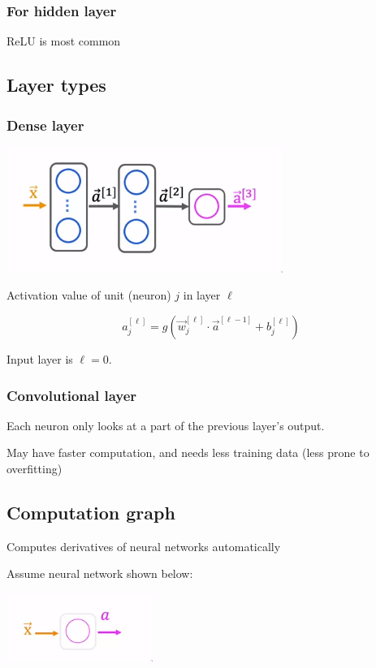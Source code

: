 \documentclass[12pt]{article}
\begin{document}
\subsubsection*{For hidden layer}

ReLU is most common

\subsection{Layer types}

\subsubsection*{Dense layer}

\includegraphics{nn/dense_layer}

Activation value of unit (neuron) $j$ in layer $\ell$

\[ a_j^{[\ell]} = g(\vec{w}_j^{[\ell]} \cdot \vec{a}^{[\ell - 1]} + b_j^{[\ell]}) \]

Input layer is $\ell = 0$.

\subsubsection*{Convolutional layer}

Each neuron only looks at a part of the previous layer's output.

May have faster computation, and needs less training data (less prone to overfitting)

\subsection{Computation graph}

Computes derivatives of neural networks automatically

Assume neural network shown below:

\includegraphics{nn/compgraph-ex/nn}
\end{document}
